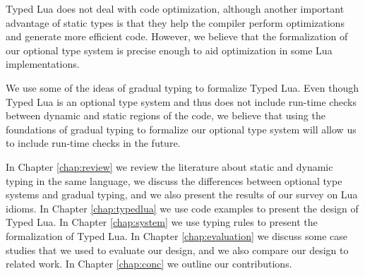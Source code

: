 Typed Lua does not deal with code optimization, although another
important advantage of static types is that they help the compiler
perform optimizations and generate more efficient code.
However, we believe that the formalization of our optional type
system is precise enough to aid optimization in some Lua implementations.

We use some of the ideas of gradual typing to formalize Typed Lua.
Even though Typed Lua is an optional type system and thus does not
include run-time checks between dynamic and static regions of the
code, we believe that using the foundations of gradual typing to
formalize our optional type system will allow us to include run-time
checks in the future.

In Chapter \ref{chap:review} we review the literature about static
and dynamic typing in the same language, we discuss the differences
between optional type systems and gradual typing, and we also
present the results of our survey on Lua idioms.
In Chapter \ref{chap:typedlua} we use code examples to present the
design of Typed Lua.
In Chapter \ref{chap:system} we use typing rules to present the
formalization of Typed Lua.
In Chapter \ref{chap:evaluation} we discuss some case studies that
we used to evaluate our design, and we also compare our design
to related work.
In Chapter \ref{chap:conc} we outline our contributions.

